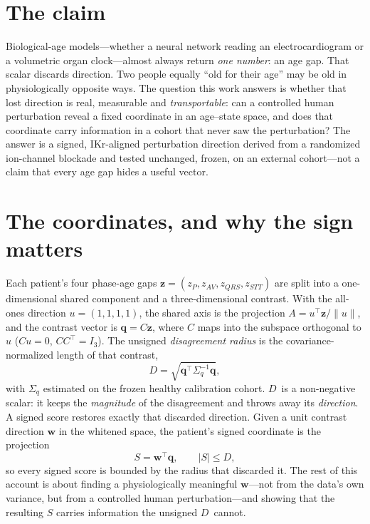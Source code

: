 \documentclass[10pt]{article}
\newcommand{\D}{\ensuremath{D}}
\newcommand{\A}{\ensuremath{A}}
\begin{document}
\section{The claim}
Biological-age models---whether a neural network reading an electrocardiogram or a volumetric
organ clock---almost always return \emph{one number}: an age gap. That scalar discards direction.
Two people equally ``old for their age'' may be old in physiologically opposite ways. The
question this work answers is whether that lost direction is real, measurable and
\emph{transportable}: can a controlled human perturbation reveal a fixed coordinate in an
age--state space, and does that coordinate carry information in a cohort that never saw the
perturbation? The answer is a signed, IKr-aligned perturbation direction derived from a randomized ion-channel
blockade and tested unchanged, frozen, on an external cohort---not a claim that every age gap hides a
useful vector.



\section{The coordinates, and why the sign matters}
Each patient's four phase-age gaps $\mathbf{z}=(z_P,z_{AV},z_{QRS},z_{STT})$ are split into a
one-dimensional shared component and a three-dimensional contrast. With the all-ones direction
$u=(1,1,1,1)$, the shared axis is the projection $\A=u^{\top}\mathbf{z}/\lVert u\rVert$, and the
contrast vector is $\mathbf{q}=C\mathbf{z}$, where $C$ maps into the subspace orthogonal to $u$
($Cu=0$, $CC^{\top}=I_3$). The unsigned \emph{disagreement radius} is the covariance-normalized
length of that contrast,
\[
\D=\sqrt{\mathbf{q}^{\top}\Sigma_q^{-1}\mathbf{q}},
\]
with $\Sigma_q$ estimated on the frozen healthy calibration cohort. \D\ is a non-negative scalar:
it keeps the \emph{magnitude} of the disagreement and throws away its \emph{direction}. A signed
score restores exactly that discarded direction. Given a unit contrast direction $\mathbf{w}$ in
the whitened space, the patient's signed coordinate is the projection
\[
S=\mathbf{w}^{\top}\mathbf{q},\qquad |S|\le\D,
\]
so every signed score is bounded by the radius that discarded it. The rest of this account is
about finding a physiologically meaningful $\mathbf{w}$---not from the data's own variance, but
from a controlled human perturbation---and showing that the resulting $S$ carries information the
unsigned \D\ cannot.
\end{document}
